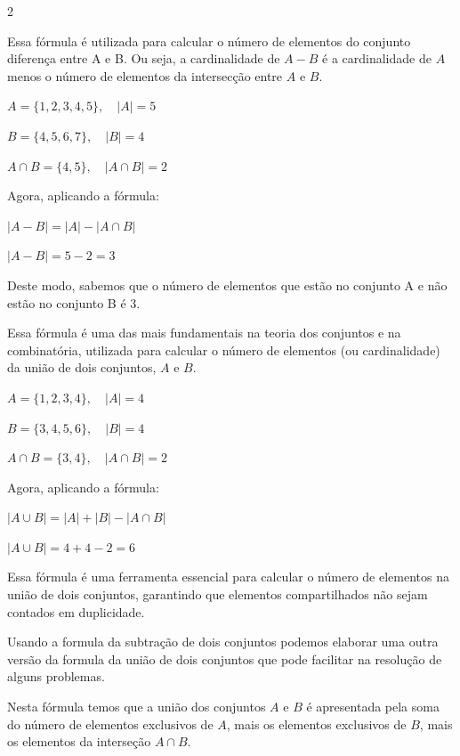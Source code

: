 \documentclass[12pt]{article}
\begin{document}
\begin{multicols}{2}


Essa fórmula é utilizada para calcular o número de elementos do conjunto diferença entre A e B. 
Ou seja, a cardinalidade de $A - B$ é a cardinalidade de $A$ menos o número de elementos da intersecção entre $A$ e $B$. 


$A = \{1, 2, 3, 4, 5\}, \quad |A| = 5$

$B = \{4, 5, 6, 7\}, \quad |B| = 4$

$A \cap B = \{4, 5\}, \quad |A \cap B| = 2$ 

Agora, aplicando a fórmula:

$|A - B| = |A| - |A \cap B|$

$|A - B| = 5 - 2 = 3$

Deste modo, sabemos que o número de elementos que estão no conjunto A e não estão no conjunto B é 3.



Essa fórmula é uma das mais fundamentais na teoria dos conjuntos e na combinatória, utilizada para calcular o número de elementos (ou cardinalidade) da união de dois conjuntos, $A$ e $B$.


$A = \{1, 2, 3, 4\}, \quad |A| = 4$

$B = \{3, 4, 5, 6\}, \quad |B| = 4$ 

$A \cap B = \{3, 4\}, \quad |A \cap B| = 2$ 

Agora, aplicando a fórmula:

$|A \cup B| = |A| + |B| - |A \cap B|$

$|A \cup B| = 4 + 4 - 2 = 6$

Essa fórmula é uma ferramenta essencial para calcular o número de elementos na união de dois conjuntos, garantindo que elementos compartilhados não sejam contados em duplicidade.


Usando a formula da subtração de dois conjuntos podemos elaborar uma outra versão da formula da união de dois conjuntos que pode facilitar na resolução de alguns problemas.


Nesta fórmula temos que a união dos conjuntos $A$ e $B$ é apresentada pela soma do número de elementos exclusivos de $A$, mais os elementos exclusivos de $B$, mais os elementos da interseção $A \cap B$.


\end{multicols}
\end{document}
